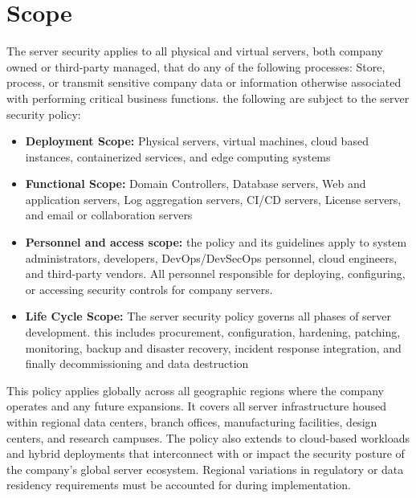 \section{Scope}
The server security applies to all physical and virtual servers, both company owned or third-party managed, that do any of the following processes: Store, process, or transmit sensitive company data or information otherwise associated with performing critical business functions. the following are subject to the server security policy:
\begin{itemize}
    \item \textbf{Deployment Scope:} Physical servers, virtual machines, cloud based instances, containerized services, and edge computing systems
    \item \textbf{Functional Scope:} Domain Controllers, Database servers, Web and application servers, Log aggregation servers, CI/CD servers, License servers, and email or collaboration servers
    \item \textbf{Personnel and access scope:} the policy and its guidelines apply to system administrators, developers, DevOps/DevSecOps personnel, cloud engineers, and third-party vendors. All personnel responsible for deploying, configuring, or accessing security controls for company servers.
    \item \textbf{Life Cycle Scope:}
    The server security policy governs all phases of server development. this includes procurement, configuration, hardening, patching, monitoring, backup and disaster recovery, incident response integration, and finally decommissioning and data destruction
\end{itemize}
This policy applies globally across all geographic regions where the company operates and any future expansions. It covers all server infrastructure housed within regional data centers, branch offices, manufacturing facilities, design centers, and research campuses. The policy also extends to cloud-based workloads and hybrid deployments that interconnect with or impact the security posture of the company’s global server ecosystem. Regional variations in regulatory or data residency requirements must be accounted for during implementation.
